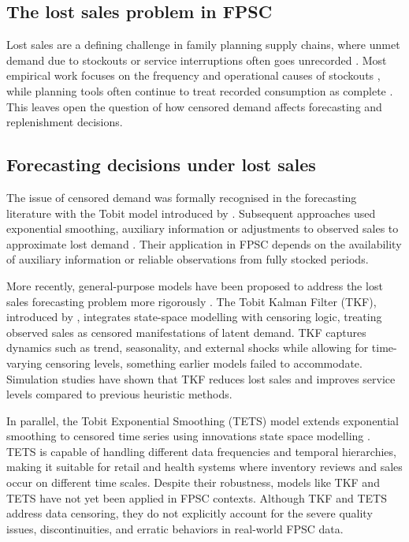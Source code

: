 \documentclass[
  11pt,
  authoryear,
  doubleblind,
  3p]{elsarticle}
\begin{document}
\subsection{The lost sales problem in
FPSC}\label{the-lost-sales-problem-in-fpsc}

Lost sales are a defining challenge in family planning supply chains,
where unmet demand due to stockouts or service interruptions often goes
unrecorded \citep{bijvank2011, trapero2024}. Most empirical work focuses
on the frequency and operational causes of stockouts
\citep{morgan2014, karimi2021}, while planning tools often continue to
treat recorded consumption as complete
\citep{family_planning_logistics_management_fplm_contraceptive_2000, hewage2025}.
This leaves open the question of how censored demand affects forecasting
and replenishment decisions.

\subsection{Forecasting decisions under lost
sales}\label{forecasting-decisions-under-lost-sales}

The issue of censored demand was formally recognised in the forecasting
literature with the Tobit model introduced by \citet{tobin1958}.
Subsequent approaches used exponential smoothing, auxiliary information
or adjustments to observed sales to approximate lost demand
\citep{nahmias1994, lau1996, hyndman_forecasting_2008}. Their
application in FPSC depends on the availability of auxiliary information
or reliable observations from fully stocked periods.

More recently, general-purpose models have been proposed to address the
lost sales forecasting problem more rigorously \citep{wangxu2025}. The
Tobit Kalman Filter (TKF), introduced by \citet{trapero2024}, integrates
state-space modelling with censoring logic, treating observed sales as
censored manifestations of latent demand. TKF captures dynamics such as
trend, seasonality, and external shocks while allowing for time-varying
censoring levels, something earlier models failed to accommodate.
Simulation studies have shown that TKF reduces lost sales and improves
service levels compared to previous heuristic methods.

In parallel, the Tobit Exponential Smoothing (TETS) model extends
exponential smoothing to censored time series using innovations state
space modelling \citep{pedregal, pedregal2026}. TETS is capable of
handling different data frequencies and temporal hierarchies, making it
suitable for retail and health systems where inventory reviews and sales
occur on different time scales. Despite their robustness, models like
TKF and TETS have not yet been applied in FPSC contexts. Although TKF
and TETS address data censoring, they do not explicitly account for the
severe quality issues, discontinuities, and erratic behaviors in
real-world FPSC data.
\end{document}
